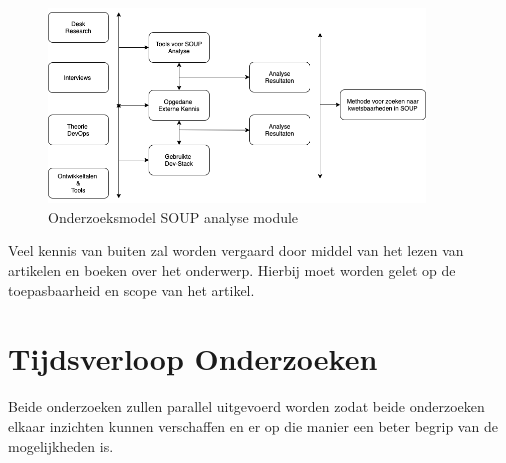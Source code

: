 \begin{figure}[h!] %
  \myfloatalign
  \includegraphics[width=10cm]{gfx/OnderzoeksmodelSOUP}
  \caption{Onderzoeksmodel SOUP analyse module}
  \label{fig:Onderzoeks model Dev-Stack}
\end{figure}

Veel kennis van buiten zal worden vergaard door middel van het lezen van artikelen en boeken over het onderwerp.
Hierbij moet worden gelet op de toepasbaarheid en scope van het artikel.

\section{Tijdsverloop Onderzoeken}\label{sec:tijdsverloop-onderzoeken}
Beide onderzoeken zullen parallel uitgevoerd worden zodat beide onderzoeken elkaar inzichten kunnen verschaffen en er op die manier een beter begrip van de mogelijkheden is.
